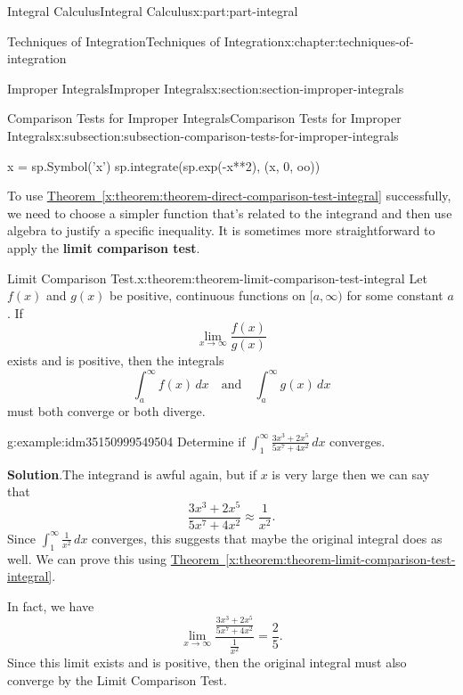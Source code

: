 \documentclass[twoside,10pt,]{book}
\newcommand{\blocktitlefont}{\relax}
\newcommand{\xreffont}{\relax}
\newcommand{\terminology}[1]{\textbf{#1}}
\numberwithin{equation}{part}
\begin{document}
\begin{partptx}{Integral Calculus}{}{Integral Calculus}{}{}{x:part:part-integral}
\begin{chapterptx}{Techniques of Integration}{}{Techniques of Integration}{}{}{x:chapter:techniques-of-integration}
\begin{sectionptx}{Improper Integrals}{}{Improper Integrals}{}{}{x:section:section-improper-integrals}
\begin{subsectionptx}{Comparison Tests for Improper Integrals}{}{Comparison Tests for Improper Integrals}{}{}{x:subsection:subsection-comparison-tests-for-improper-integrals}
\begin{sageinput}
x = sp.Symbol('x')
sp.integrate(sp.exp(-x**2), (x, 0, oo))
\end{sageinput}
To use \hyperref[x:theorem:theorem-direct-comparison-test-integral]{Theorem~{\xreffont\ref{x:theorem:theorem-direct-comparison-test-integral}}} successfully, we need to choose a simpler function that's related to the integrand and then use algebra to justify a specific inequality. It is sometimes more straightforward to apply the \terminology{limit comparison test}.%
\begin{theorem}{Limit Comparison Test.}{}{x:theorem:theorem-limit-comparison-test-integral}%
%
Let \(f(x)\) and \(g(x)\) be positive, continuous functions on \([a,\infty)\) for some constant \(a\). If%
\begin{equation*}
\lim_{x\to\infty}\frac{f(x)}{g(x)}
\end{equation*}
exists and is positive, then the integrals%
\begin{equation*}
\int_{a}^{\infty}f(x)\,dx\quad\text{and}\quad\int_{a}^{\infty}g(x)\,dx
\end{equation*}
must both converge or both diverge.%
\end{theorem}
\begin{example}{}{g:example:idm35150999549504}%
Determine if \(\displaystyle\int_{1}^{\infty}\frac{3x^{3} + 2x^{5}}{5x^{7} + 4x^{2}}\,dx\) converges.%
\par\smallskip%
\noindent\textbf{\blocktitlefont Solution}.\hypertarget{g:solution:idm35150999548608}{}\quad{}The integrand is awful again, but if \(x\) is very large then we can say that%
\begin{equation*}
\frac{3x^{3} + 2x^{5}}{5x^{7} + 4x^{2}} \approx \frac{1}{x^{2}}.
\end{equation*}
Since \(\int_{1}^{\infty}\frac{1}{x^{2}}\,dx\) converges, this suggests that maybe the original integral does as well. We can prove this using \hyperref[x:theorem:theorem-limit-comparison-test-integral]{Theorem~{\xreffont\ref{x:theorem:theorem-limit-comparison-test-integral}}}.%
\par
In fact, we have%
\begin{equation*}
\lim_{x\to\infty}\frac{\frac{3x^{3} + 2x^{5}}{5x^{7} + 4x^{2}}}{\frac{1}{x^{2}}} = \frac{2}{5}.
\end{equation*}
Since this limit exists and is positive, then the original integral must also converge by the Limit Comparison Test.%
\end{example}
\end{subsectionptx}

\end{sectionptx}
\end{chapterptx}
\end{partptx}
\end{document}
